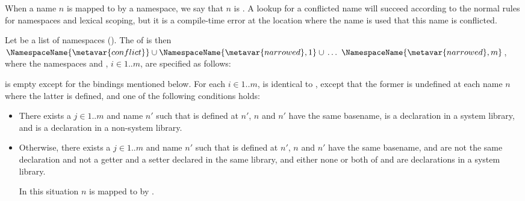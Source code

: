 \documentclass[makeidx]{article}
\begin{document}
{\LMHash{}%
When a name $n$ is mapped to \ConflictValue{} by a namespace,
we say that $n$ is
.
A lookup for a conflicted name will succeed according to
the normal rules for namespaces and lexical scoping,
but it is a compile-time error at the location where the name is used
that this name is conflicted.

\LMHash{}%
Let  be a list of namespaces
().
The
of  is then
$\NamespaceName{\metavar{conflict}} \cup
\NamespaceName{\metavar{narrowed},1} \cup\,
\ldots\ \NamespaceName{\metavar{narrowed},m}$,
where the namespaces  and
, $i \in 1 .. m$,
are specified as follows:

\LMHash{}%
 is empty except for the
bindings mentioned below.
For each $i \in 1 .. m$,
 is identical to ,
except that the former is undefined at each name $n$ where
the latter is defined,
and one of the following conditions holds:

\begin{itemize}
\item There exists a $j \in 1 .. m$ and name $n'$ such that
   is defined at $n'$,
  $n$ and $n'$ have the same basename,
   is a declaration in a system library,
  and  is a declaration in a non-system library.
\item Otherwise, there exists a $j \in 1 .. m$ and name $n'$ such that
   is defined at $n'$,
  $n$ and $n'$ have the same basename,
   and  are not the same declaration
  and not a getter and a setter declared in the same library,
  and either none or both of
   and 
  are declarations in a system library.

  In this situation $n$ is mapped to \ConflictValue{}
  by .
\end{itemize}

}
\end{document}
